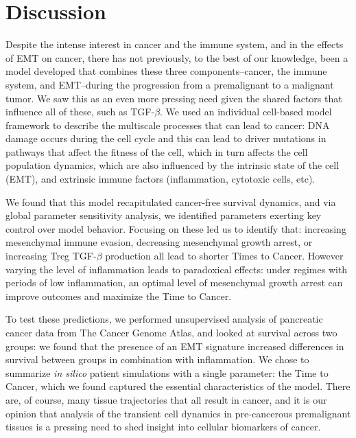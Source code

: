 \documentclass[11pt]{article}
\begin{document}
\section{Discussion}\label{Discussion}
Despite the intense interest in cancer and the immune system, and in the effects of EMT on cancer, there has not previously, to the best of our knowledge, been a model developed that combines these three components--cancer, the immune system, and EMT--during the progression from a premalignant to a malignant tumor. We saw this as an even more pressing need given the shared factors that influence all of these, such as TGF-$\beta$. We used an individual cell-based model framework to describe the multiscale processes that can lead to cancer: DNA damage occurs during the cell cycle and this can lead to driver mutations in pathways that affect the fitness of the cell, which in turn affects the cell population dynamics, which are also influenced by the intrinsic state of the cell (EMT), and extrinsic immune factors (inflammation, cytotoxic cells, etc).
\par
We found that this model recapitulated cancer-free survival dynamics, and via global parameter sensitivity analysis, we identified parameters exerting key control over model behavior. Focusing on these led us to identify that: increasing mesenchymal immune evasion, decreasing mesenchymal growth arrest, or increasing Treg TGF-$\beta$ production all lead to shorter Times to Cancer. However varying the level of inflammation leads to paradoxical effects: under regimes with periods of low inflammation, an optimal level of mesenchymal growth arrest can improve outcomes and maximize the Time to Cancer.
\par
To test these predictions, we performed unsupervised analysis of pancreatic cancer data from The Cancer Genome Atlas, and looked at survival across two groups: we found that the presence of an EMT signature increased differences in survival between groups in combination with inflammation. We chose to summarize {\em in silico} patient simulations with a single parameter: the Time to Cancer, which we found captured the essential characteristics of the model. There are, of course, many tissue trajectories that all result in cancer, and it is our opinion that analysis of the transient cell dynamics in pre-cancerous premalignant tissues is a pressing need to shed insight into cellular biomarkers of cancer.
\par
\end{document}
